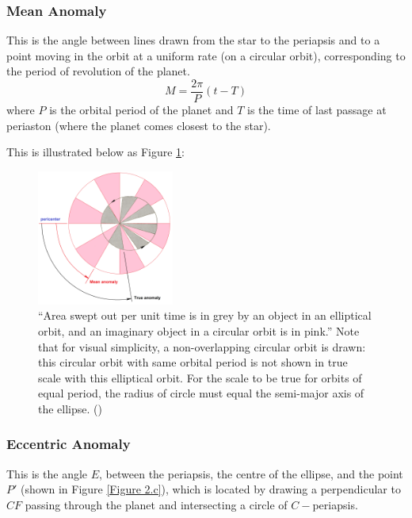 \documentclass[11pt]{article}
\begin{document}
\hypertarget{mean-anomaly}{%
\subsubsection{Mean Anomaly}\label{mean-anomaly}}

This is the angle between lines drawn from the star to the periapsis and
to a point moving in the orbit at a uniform rate (on a circular orbit),
corresponding to the period of revolution of the planet.
\begin{equation*}
M = \frac{2\pi}{P}(t-T) 
\end{equation*} where \(P\) is the orbital period of the planet and
\(T\) is the time of last passage at periaston (where the planet comes
closest to the star).

This is illustrated below as Figure \ref{Figure 2.b}:

\begin{figure}[!ht]
	\centering
	\includegraphics[width=0.4\textwidth]{../images/Mean_anomaly_diagram.png}
	\caption{``Area swept out per unit time is in grey by an object in an elliptical orbit, and an imaginary object in a circular orbit is in pink.'' Note that for visual simplicity, a non-overlapping circular orbit is drawn: this circular orbit with same orbital period is not shown in true scale with this elliptical orbit. For the scale to be true for orbits of equal period, the radius of circle must equal the semi-major axis of the ellipse. (\cite{Wikib})} 
	
	\label{Figure 2.b}
\end{figure}

    \hypertarget{eccentric-anomaly}{%
\subsubsection{Eccentric Anomaly}\label{eccentric-anomaly}}

This is the angle \(E\), between the periapsis, the centre of the
ellipse, and the point $P'$ (shown in Figure \ref{Figure 2.c}), which is located by
drawing a perpendicular to \(CF\) passing through the planet and
intersecting a circle of \(C-\)periapsis.
\end{document}
